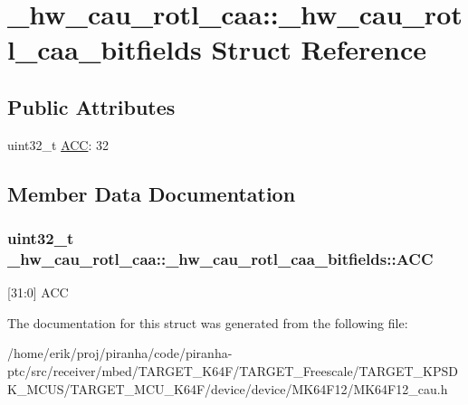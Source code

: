 \hypertarget{struct__hw__cau__rotl__caa_1_1__hw__cau__rotl__caa__bitfields}{}\section{\+\_\+hw\+\_\+cau\+\_\+rotl\+\_\+caa\+:\+:\+\_\+hw\+\_\+cau\+\_\+rotl\+\_\+caa\+\_\+bitfields Struct Reference}
\label{struct__hw__cau__rotl__caa_1_1__hw__cau__rotl__caa__bitfields}
\subsection*{Public Attributes}
\begin{DoxyCompactItemize}
\item 
uint32\+\_\+t \hyperlink{struct__hw__cau__rotl__caa_1_1__hw__cau__rotl__caa__bitfields_a5fc52eaaff062448a06d1a40d3aa2506}{A\+CC}\+: 32
\end{DoxyCompactItemize}


\subsection{Member Data Documentation}
\subsubsection[{\texorpdfstring{A\+CC}{ACC}}]{\setlength{\rightskip}{0pt plus 5cm}uint32\+\_\+t \+\_\+hw\+\_\+cau\+\_\+rotl\+\_\+caa\+::\+\_\+hw\+\_\+cau\+\_\+rotl\+\_\+caa\+\_\+bitfields\+::\+A\+CC}\hypertarget{struct__hw__cau__rotl__caa_1_1__hw__cau__rotl__caa__bitfields_a5fc52eaaff062448a06d1a40d3aa2506}{}\label{struct__hw__cau__rotl__caa_1_1__hw__cau__rotl__caa__bitfields_a5fc52eaaff062448a06d1a40d3aa2506}
\mbox{[}31\+:0\mbox{]} A\+CC 

The documentation for this struct was generated from the following file\+:\begin{DoxyCompactItemize}
\item 
/home/erik/proj/piranha/code/piranha-\/ptc/src/receiver/mbed/\+T\+A\+R\+G\+E\+T\+\_\+\+K64\+F/\+T\+A\+R\+G\+E\+T\+\_\+\+Freescale/\+T\+A\+R\+G\+E\+T\+\_\+\+K\+P\+S\+D\+K\+\_\+\+M\+C\+U\+S/\+T\+A\+R\+G\+E\+T\+\_\+\+M\+C\+U\+\_\+\+K64\+F/device/device/\+M\+K64\+F12/M\+K64\+F12\+\_\+cau.\+h\end{DoxyCompactItemize}
